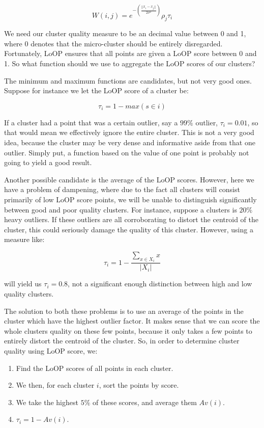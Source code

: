 \documentclass[12pt,a4paper,oneside]{report}
\begin{document}
\[W(i,j) = e^{-(\frac{||x_i-x_j||}{2\sigma^2})}\rho_j\tau_i\]

We need our cluster quality measure to be an decimal value between 0 and 1, where 0 denotes that the micro-cluster should be entirely disregarded. Fortunately, LoOP ensures that all points are given a LoOP score between 0 and 1. So what function should we use to aggregate the LoOP scores of our clusters?

The minimum and maximum functions are candidates, but not very good ones. Suppose for instance we let the LoOP score of a cluster be:

\[ \tau_i = 1-max(s \in i)\]

If a cluster had a point that was a certain outlier, say a $99\%$ outlier, $\tau_i = 0.01$, so that would mean we  effectively ignore the entire cluster. This is not a very good idea, because the cluster may be very dense and informative aside from that one outlier. Simply put, a function based on the value of one point is probably not going to yield a good result. 

Another possible candidate is the average of the LoOP scores. However, here we have a problem of dampening, where due to the fact all clusters will consist primarily of low LoOP score points, we will be unable to distinguish significantly between good and poor quality clusters. For instance, suppose a clusters is $20\%$ heavy outliers. If these outliers are all corroborating to distort the centroid of the cluster, this could seriously damage the quality of this cluster. However, using a measure like:

\[\tau_i = 1- \frac{\sum_{x \in X_i}x}{|X_i|}\]

will yield us $\tau_i = 0.8$, not a significant enough distinction between high and low quality clusters. 

The solution to both these problems is to use an average of the points in the cluster which have the highest outlier factor. It makes sense that we can score the whole clusters quality on these few points, because it only takes a few points to entirely distort the centroid of the cluster. So, in order to determine cluster quality using LoOP score, we:

\begin{enumerate}
\item Find the LoOP scores of all points in each cluster. 
\item We then, for each cluster $i$, sort the points by score. 
\item We take the highest $5\%$ of these scores, and average them $Av(i)$. 
\item $\tau_i = 1 - Av(i)$. 
\end{enumerate}
 
\end{document}
